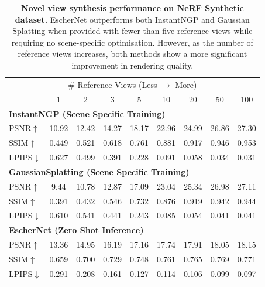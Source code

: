 \documentclass[10pt,twocolumn,letterpaper]{article}
\begin{document}
\begin{table}[t!]
   \centering
   \footnotesize
   \setlength{\tabcolsep}{0.45em}
       \begin{tabular}{lcccccccc}
       \toprule
        \multicolumn{9}{c}{\# Reference Views (Less $\to$ More)} \\
         & 1 & 2 & 3 & 5 & 10 & 20 & 50 & 100 \\
        \midrule 
        \multicolumn{9}{l}{{\bf InstantNGP (Scene Specific Training)}} \\
         PSNR$\uparrow$ & 10.92 & 12.42& 14.27& 18.17& 22.96& 24.99& 26.86& 27.30 \\
        SSIM$\uparrow$  & 0.449 & 0.521& 0.618& 0.761& 0.881& 0.917& 0.946& 0.953\\
        LPIPS$\downarrow$  & 0.627 & 0.499& 0.391& 0.228& 0.091& 0.058& 0.034& 0.031 \\
        \midrule 
        \multicolumn{9}{l}{{\bf GaussianSplatting (Scene Specific Training)}} \\
         PSNR$\uparrow$ & 9.44 & 10.78& 12.87& 17.09& 23.04& 25.34& 26.98& 27.11 \\
        SSIM$\uparrow$  & 0.391 & 0.432& 0.546& 0.732& 0.876& 0.919& 0.942& 0.944\\
        LPIPS$\downarrow$  & 0.610 & 0.541& 0.441& 0.243& 0.085& 0.054& 0.041& 0.041 \\
        \midrule 
        \multicolumn{9}{l}{{\bf EscherNet (Zero Shot Inference)}} \\
        PSNR$\uparrow$  & 13.36 & 14.95& 16.19& 17.16& 17.74& 17.91& 18.05& 18.15 \\
        SSIM$\uparrow$  & 0.659 & 0.700& 0.729& 0.748& 0.761& 0.765& 0.769& 0.771\\
        LPIPS$\downarrow$ & 0.291 & 0.208& 0.161& 0.127& 0.114& 0.106& 0.099& 0.097\\
        \bottomrule
       \end{tabular}
   \caption{{\bf Novel view synthesis performance on NeRF Synthetic dataset.} EscherNet outperforms both InstantNGP and Gaussian Splatting when provided with fewer than five reference views while requiring no scene-specific optimisation. However, as the number of reference views increases, both methods show a more significant improvement in rendering quality.}
   \label{tab:nerf2}
   \vspace{-0.4cm}
\end{table}
\end{document}
